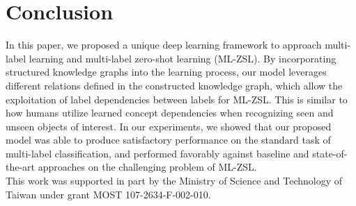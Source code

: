 \documentclass[10pt,twocolumn,letterpaper]{article}
\begin{document}
\section{Conclusion}
In this paper, we proposed a unique deep learning framework to approach multi-label learning and multi-label zero-shot learning (ML-ZSL). 
By incorporating structured knowledge graphs into the learning process, our model leverages different relations defined in the constructed knowledge graph, which allow the exploitation of label dependencies between labels for ML-ZSL. This is similar to how humans utilize learned concept dependencies when recognizing seen and unseen objects of interest. In our experiments, we showed that our proposed model was able to produce satisfactory performance on the standard task of multi-label classification, and performed favorably against baseline and state-of-the-art approaches on the challenging problem of ML-ZSL.\\
This work was supported in part by the Ministry of Science
and Technology of Taiwan under grant MOST 107-2634-F-002-010.

{\small


}
\end{document}
